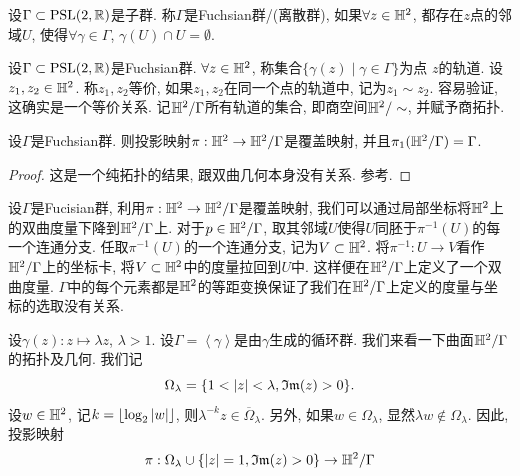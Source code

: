 \begin{definition}
    设$\Gamma \subset {\text{PSL}}(2,{\mathbb{R}})$是子群.  称$\Gamma$是Fuchsian群/(离散群), 如果$\forall z \in {\mathbb{H}^2}$, 都存在$z$点的邻域$U$, 使得$\forall \gamma \in \Gamma$, $\gamma(U) \cap U=\emptyset$.
\end{definition}
\begin{definition}
    设$\Gamma \subset {\text{PSL}}(2,{\mathbb{R}})$是Fuchsian群. $\forall z \in {\mathbb{H}^2}$, 称集合$\{\gamma(z)\mid \gamma \in \Gamma\}$为点 $z$的轨道. 设$z_1, z_2\in {\mathbb{H}^2}$. 称$z_1,z_2$等价,  如果$z_1,z_2$在同一个点的轨道中, 记为$z_1\sim z_2$. 容易验证, 这确实是一个等价关系.  记${\mathbb{H}^2}/\Gamma$所有轨道的集合, 即商空间${\mathbb{H}^2}/\sim $, 并赋予商拓扑.
\end{definition}
\begin{theorem}\label{covering}
    设$\Gamma$是Fuchsian群. 则投影映射$\pi: {\mathbb{H}^2} \to {\mathbb{H}^2}/\Gamma$是覆盖映射, 并且$\pi_1({\mathbb{H}^2}/\Gamma)=\Gamma$.
\end{theorem}
\begin{proof}
    这是一个纯拓扑的结果, 跟双曲几何本身没有关系. 参考\cite[定理81.5]{munkres}.
\end{proof}
\par 设$\Gamma$是Fucisian群, 利用$\pi: {\mathbb{H}^2} \to {\mathbb{H}^2}/\Gamma$是覆盖映射, 我们可以通过局部坐标将${\mathbb{H}^2}$上的双曲度量下降到${\mathbb{H}^2}/\Gamma$上. 对于$p \in {\mathbb{H}^2}/\Gamma$, 取其邻域$U$使得$U$同胚于$\pi^{-1}(U)$的每一个连通分支.  任取$\pi^{-1}(U)$的一个连通分支, 记为$V\subset {\mathbb{H}^2}$. 将$\pi^{-1}: U \to V$看作${\mathbb{H}^2}/\Gamma$上的坐标卡, 将$V\subset {\mathbb{H}^2}$中的度量拉回到$U$中. 这样便在${\mathbb{H}^2}/\Gamma$上定义了一个双曲度量. $\Gamma$中的每个元素都是${\mathbb{H}^2}$的等距变换保证了我们在${\mathbb{H}^2}/\Gamma$上定义的度量与坐标的选取没有关系.
\par 设$\gamma(z): z\mapsto \lambda z$, $\lambda>1$.  设$\Gamma=\left<\gamma\right >$是由$\gamma$生成的循环群.  我们来看一下曲面${\mathbb{H}^2}/\Gamma$的拓扑及几何.  我们记
\begin{equation}
    \Omega_\lambda=\{1< {\left | z \right |}< \lambda, {\mathfrak{Im}}(z) >0\}.
\end{equation}
设$w \in {\mathbb{H}^2}$, 记$k={\lfloor {\log_2 {\left | w \right |}} \rfloor}$, 则$\lambda^{-k} z \in \overline{\Omega}_\lambda$. 另外, 如果$w \in \Omega_\lambda$, 显然$\lambda w \notin \Omega_\lambda$. 因此, 投影映射
\begin{equation}
    \pi: \Omega_\lambda \cup \{{\left | z \right |}=1, {\mathfrak{Im}}(z)>0\} \to {\mathbb{H}^2}/\Gamma
\end{equation}

